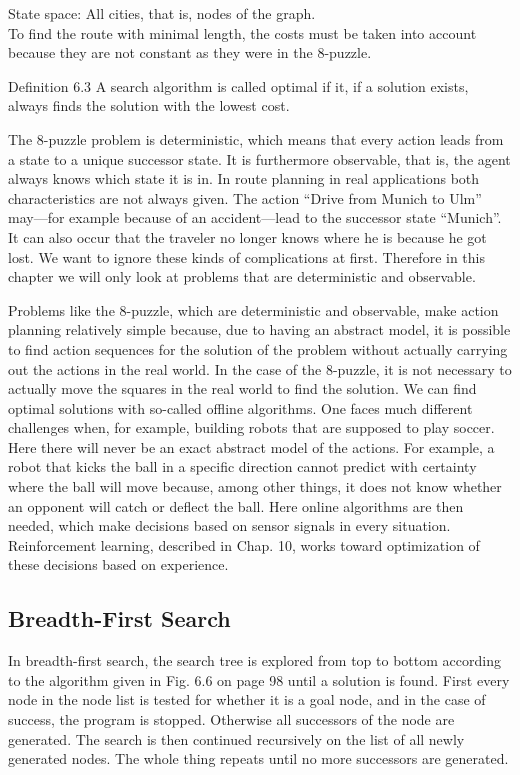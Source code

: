 \documentclass[10pt]{book}
\begin{document}
State space: All cities, that is, nodes of the graph.\\
To find the route with minimal length, the costs must be taken into account because they are not constant as they were in the 8-puzzle.

Definition 6.3 A search algorithm is called optimal if it, if a solution exists, always finds the solution with the lowest cost.

The 8-puzzle problem is deterministic, which means that every action leads from a state to a unique successor state. It is furthermore observable, that is, the agent always knows which state it is in. In route planning in real applications both characteristics are not always given. The action ``Drive from Munich to Ulm'' may---for example because of an accident---lead to the successor state ``Munich''. It can also occur that the traveler no longer knows where he is because he got lost. We want to ignore these kinds of complications at first. Therefore in this chapter we will only look at problems that are deterministic and observable.

Problems like the 8-puzzle, which are deterministic and observable, make action planning relatively simple because, due to having an abstract model, it is possible to find action sequences for the solution of the problem without actually carrying out the actions in the real world. In the case of the 8-puzzle, it is not necessary to actually move the squares in the real world to find the solution. We can find optimal solutions with so-called offline algorithms. One faces much different challenges when, for example, building robots that are supposed to play soccer. Here there will never be an exact abstract model of the actions. For example, a robot that kicks the ball in a specific direction cannot predict with certainty where the ball will move because, among other things, it does not know whether an opponent will catch or deflect the ball. Here online algorithms are then needed, which make decisions based on sensor signals in every situation. Reinforcement learning, described in Chap. 10, works toward optimization of these decisions based on experience.

\subsection{Breadth-First Search}
In breadth-first search, the search tree is explored from top to bottom according to the algorithm given in Fig. 6.6 on page 98 until a solution is found. First every node in the node list is tested for whether it is a goal node, and in the case of success, the program is stopped. Otherwise all successors of the node are generated. The search is then continued recursively on the list of all newly generated nodes. The whole thing repeats until no more successors are generated.
\end{document}
